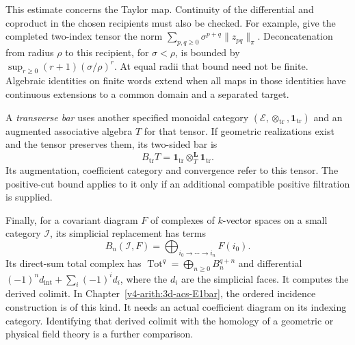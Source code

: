 This estimate concerns the Taylor map. Continuity of the
differential and coproduct in the chosen recipients must also be
checked. For example, give the completed two-index tensor the norm
\(\sum_{p,q\geq0}\sigma^{p+q}\|z_{pq}\|_\pi\).
Deconcatenation from radius \(\rho\) to this recipient, for
\(\sigma<\rho\), is bounded by
\(\sup_{r\geq0}(r+1)(\sigma/\rho)^r\). At equal radii that
bound need not be finite. Algebraic identities on finite words
extend when all maps in those identities have continuous
extensions to a common domain and a separated target.

A \emph{transverse bar} uses another specified monoidal category
\((\mathcal E,\otimes_{\mathrm{tr}},\mathbf1_{\mathrm{tr}})\)
and an augmented associative algebra \(T\) for that tensor.
If geometric realizations exist and the tensor preserves them,
its two-sided bar is
\[
 B_{\mathrm{tr}}T
     =\mathbf1_{\mathrm{tr}}
          \otimes_T^{\mathbf L}\mathbf1_{\mathrm{tr}}.
\]
Its augmentation, coefficient category and convergence refer to
this tensor. The positive-cut bound applies to it only if an
additional compatible positive filtration is supplied.

Finally, for a covariant diagram \(F\) of complexes of \(k\)-vector
spaces on a small category \(\mathcal I\), its simplicial
replacement has terms
\[
 B_n(\mathcal I,F)
       =\bigoplus_{i_0\to\cdots\to i_n}F(i_0).
\]
Its direct-sum total complex has
\(\operatorname{Tot}^q=\bigoplus_{n\geq0}B_n^{q+n}\) and
differential \((-1)^n d_{\mathrm{int}}+\sum_i(-1)^id_i\), where
the \(d_i\) are the simplicial faces. It computes the derived colimit. In
Chapter~\ref{v4-arith:3d-acs-E1bar}, the ordered incidence construction
is of this kind. It needs an actual coefficient diagram on its
indexing category. Identifying that derived colimit with the
homology of a geometric or physical field theory is a further
comparison.
